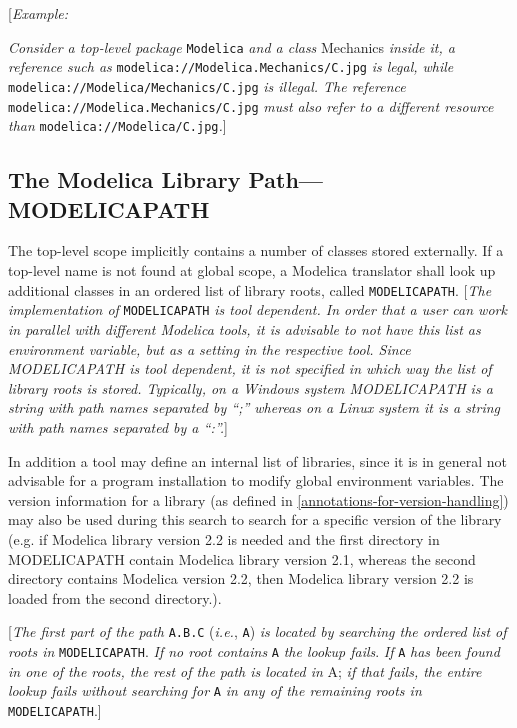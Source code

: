 {[}\emph{Example:}

\emph{Consider a top-level package} \lstinline[basicstyle=\ttfamily]!Modelica! \emph{and a class}
Mechanics \emph{inside it, a reference such as}
\lstinline[basicstyle=\ttfamily]!modelica://Modelica.Mechanics/C.jpg! \emph{is legal, while}
\lstinline[basicstyle=\ttfamily]!modelica://Modelica/Mechanics/C.jpg! \emph{is illegal. The reference}
\lstinline[basicstyle=\ttfamily]!modelica://Modelica.Mechanics/C.jpg! \emph{must also refer to a different
resource than} \lstinline[basicstyle=\ttfamily]!modelica://Modelica/C.jpg!\emph{.}{]}

\subsection{The Modelica Library Path---MODELICAPATH}

The top-level scope implicitly contains a number of classes stored
externally. If a top-level name is not found at global scope, a Modelica
translator shall look up additional classes in an ordered list of
library roots, called \lstinline[basicstyle=\ttfamily]!MODELICAPATH!. {[}\emph{The implementation of}
\lstinline[basicstyle=\ttfamily]!MODELICAPATH! \emph{is tool dependent. In order that a user can work in
parallel with different Modelica tools, it is advisable to not have this
list as environment variable, but as a setting in the respective tool.
Since MODELICAPATH is tool dependent, it is not specified in which way
the list of library roots is stored. Typically, on a Windows system
MODELICAPATH is a string with path names separated by ``;'' whereas on a
Linux system it is a string with path names separated by a ``:''.}{]}

In addition a tool may define an internal list of libraries, since it is
in general not advisable for a program installation to modify global
environment variables. The version information for a library (as defined
in \autoref{annotations-for-version-handling}) may also be used during this search to search for a
specific version of the library (e.g. if Modelica library version 2.2 is
needed and the first directory in MODELICAPATH contain Modelica library
version 2.1, whereas the second directory contains Modelica version 2.2,
then Modelica library version 2.2 is loaded from the second directory.).

{[}\emph{The first part of the path} \lstinline[basicstyle=\ttfamily]!A.B.C! (\emph{i.e.}, \lstinline[basicstyle=\ttfamily]!A!) \emph{is
located by searching the ordered list of roots in} \lstinline[basicstyle=\ttfamily]!MODELICAPATH!.
\emph{If no root contains} \lstinline[basicstyle=\ttfamily]!A! \emph{the lookup fails}. \emph{If} \lstinline[basicstyle=\ttfamily]!A!
\emph{has been found in one of the roots, the rest of the path is
located in} A; \emph{if that fails, the entire lookup fails without
searching} \emph{for} \lstinline[basicstyle=\ttfamily]!A! \emph{in any of the remaining roots in}
\lstinline[basicstyle=\ttfamily]!MODELICAPATH!.{]}

